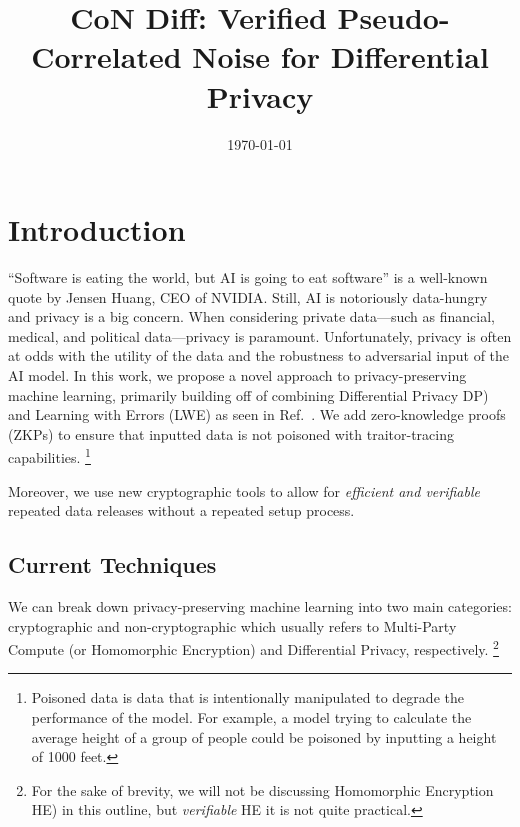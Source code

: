 \documentclass[11pt]{article}
\newcommand{\myname}{Lev Stambler}
\begin{document}
\title{CoN Diff: Verified Pseudo-Correlated Noise for Differential Privacy}


\date{\today}
\maketitle




\section{Introduction}
    ``Software is eating the world, but AI is going to eat software'' is a well-known quote by Jensen Huang, CEO of NVIDIA.
    Still, AI is notoriously data-hungry and privacy is a big concern.
    When considering private data---such as financial, medical, and political data---privacy is paramount.
    Unfortunately, privacy is often at odds with the utility of the data and the robustness to adversarial input of the AI model.
    In this work, we propose a novel approach to privacy-preserving machine learning, primarily building off of combining Differential Privacy DP) and Learning with Errors (LWE) as seen in Ref.~\cite{stevens2021efficientdifferentiallyprivatesecure}.
    We add zero-knowledge proofs (ZKPs) to ensure that inputted data is not poisoned with traitor-tracing capabilities.
    \footnote{Poisoned data is data that is intentionally manipulated to degrade the performance of the model.
For example, a model trying to calculate the average height of a group of people could be poisoned by inputting a height of 1000 feet.}
    
    Moreover, we use new cryptographic tools to allow for \emph{efficient and verifiable} repeated data releases without a repeated setup process.

\subsection{Current Techniques}
We can break down privacy-preserving machine learning into two main categories: cryptographic and non-cryptographic which usually refers to Multi-Party Compute (or Homomorphic Encryption) and Differential Privacy, respectively.
\footnote{For the sake of brevity, we will not be discussing Homomorphic Encryption HE) in this outline, but \emph{verifiable} HE it is not quite practical.}
\end{document}

